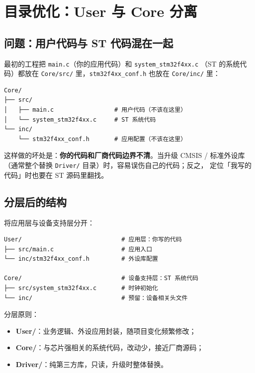 \section{目录优化：User 与 Core 分离}\label{sec:restructure}

\subsection{问题：用户代码与 ST 代码混在一起}

最初的工程把 \texttt{main.c}（你的应用代码）和 \texttt{system\_stm32f4xx.c}
（ST 的系统代码）都放在 \texttt{Core/src/} 里，\texttt{stm32f4xx\_conf.h}
也放在 \texttt{Core/inc/} 里：

\begin{lstlisting}[style=generic]
Core/
├── src/
│   ├── main.c                 # 用户代码（不该在这里）
│   └── system_stm32f4xx.c     # ST 系统代码
└── inc/
    └── stm32f4xx_conf.h       # 应用配置（不该在这里）
\end{lstlisting}

这样做的坏处是：\textbf{你的代码和厂商代码边界不清}。当升级 CMSIS / 标准外设库
（通常整个替换 \texttt{Driver/} 目录）时，容易误伤自己的代码；反之，
定位「我写的代码」时也要在 ST 源码里翻找。

\subsection{分层后的结构}

将应用层与设备支持层分开：

\begin{lstlisting}[style=generic]
User/                            # 应用层：你写的代码
├── src/main.c                   # 应用入口
└── inc/stm32f4xx_conf.h         # 外设库配置

Core/                            # 设备支持层：ST 系统代码
├── src/system_stm32f4xx.c       # 时钟初始化
└── inc/                         # 预留：设备相关头文件
\end{lstlisting}

分层原则：

\begin{itemize}
  \item \textbf{User/}：业务逻辑、外设应用封装，随项目变化频繁修改；
  \item \textbf{Core/}：与芯片强相关的系统代码，改动少，接近厂商源码；
  \item \textbf{Driver/}：纯第三方库，只读，升级时整体替换。
\end{itemize}

